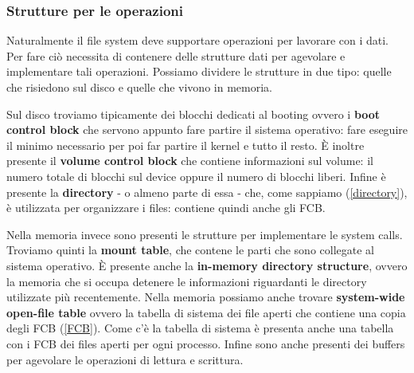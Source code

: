 % 
\subsubsection{Strutture per le operazioni}
Naturalmente il file system deve supportare operazioni per lavorare con i dati. Per fare ciò necessita di contenere delle strutture dati per agevolare e implementare tali operazioni. Possiamo dividere le strutture in due tipo: quelle che risiedono sul disco e quelle che vivono in memoria. 

Sul disco troviamo tipicamente dei blocchi dedicati al booting ovvero i \textbf{boot control block} che servono appunto fare partire il sistema operativo: fare eseguire il minimo necessario per poi far partire il kernel e tutto il resto. È inoltre presente il \textbf{volume control block} che contiene informazioni sul volume: il numero totale di blocchi sul device oppure il numero di blocchi liberi. Infine è presente la \textbf{directory} - o almeno parte di essa - che, come sappiamo (\ref{directory}), è utilizzata per organizzare i files: contiene quindi anche gli FCB.

Nella memoria invece sono presenti le strutture per implementare le system calls. Troviamo quinti la \textbf{mount table}, che contene le parti che sono collegate al sistema operativo. È presente anche la \textbf{in-memory directory structure}, ovvero la memoria che si occupa detenere le informazioni riguardanti le directory utilizzate più recentemente. Nella memoria possiamo anche trovare \textbf{system-wide open-file table} ovvero la tabella di sistema dei file aperti che contiene una copia degli FCB (\ref{FCB}). Come c'è la tabella di sistema è presenta anche una tabella con i FCB dei files aperti per ogni processo. Infine sono anche presenti dei buffers per agevolare le operazioni di lettura e scrittura.

% 
